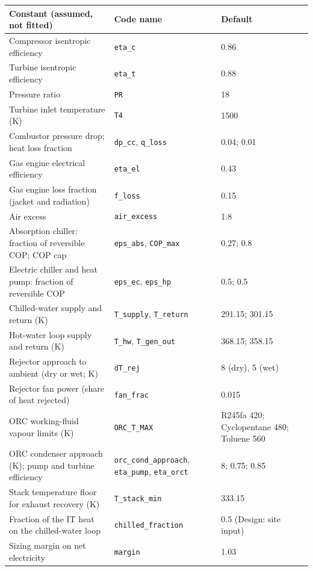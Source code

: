 \begingroup\small\renewcommand{\arraystretch}{1.12}
\begin{tabular}{@{}p{7.2cm}p{4.6cm}p{3.6cm}@{}}
\toprule
Constant (assumed, not fitted) & Code name & Default \\
\midrule
Compressor isentropic efficiency & \texttt{eta\_c} & 0.86 \\
Turbine isentropic efficiency & \texttt{eta\_t} & 0.88 \\
Pressure ratio & \texttt{PR} & 18 \\
Turbine inlet temperature (K) & \texttt{T4} & 1500 \\
Combustor pressure drop; heat loss fraction & \texttt{dp\_cc}, \texttt{q\_loss} & 0.04; 0.01 \\
Gas engine electrical efficiency & \texttt{eta\_el} & 0.43 \\
Gas engine loss fraction (jacket and radiation) & \texttt{f\_loss} & 0.15 \\
Air excess & \texttt{air\_excess} & 1.8 \\
Absorption chiller: fraction of reversible COP; COP cap & \texttt{eps\_abs}, \texttt{COP\_max} & 0.27; 0.8 \\
Electric chiller and heat pump: fraction of reversible COP & \texttt{eps\_ec}, \texttt{eps\_hp} & 0.5; 0.5 \\
Chilled-water supply and return (K) & \texttt{T\_supply}, \texttt{T\_return} & 291.15; 301.15 \\
Hot-water loop supply and return (K) & \texttt{T\_hw}, \texttt{T\_gen\_out} & 368.15; 358.15 \\
Rejector approach to ambient (dry or wet; K) & \texttt{dT\_rej} & 8 (dry), 5 (wet) \\
Rejector fan power (share of heat rejected) & \texttt{fan\_frac} & 0.015 \\
ORC working-fluid vapour limits (K) & \texttt{ORC\_T\_MAX} & R245fa 420; Cyclopentane 480; Toluene 560 \\
ORC condenser approach (K); pump and turbine efficiency & \texttt{orc\_cond\_approach}, \texttt{eta\_pump}, \texttt{eta\_orct} & 8; 0.75; 0.85 \\
Stack temperature floor for exhaust recovery (K) & \texttt{T\_stack\_min} & 333.15 \\
Fraction of the IT heat on the chilled-water loop & \texttt{chilled\_fraction} & 0.5 (Design: site input) \\
Sizing margin on net electricity & \texttt{margin} & 1.03 \\
\bottomrule
\end{tabular}\endgroup
